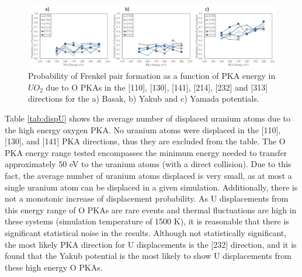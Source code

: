 \documentclass[8pt]{article}   	%
\begin{document}
\begin{figure}[h]
 \centering
 \includegraphics[width=1.0\textwidth]{FP_OE.png}
 \caption{Probability of Frenkel pair formation as a function of PKA energy in $UO_2$ due to O PKAs in the [110], [130], [141], [214], [232] and [313] directions for the a) Basak, b) Yakub and c) Yamada potentials.  }
 \label{fig:fpoe}
\end{figure}

Table \ref{tab:dispU} shows the average number of displaced uranium atoms due to the high energy oxygen PKA. No uranium atoms were displaced in the  [110], [130], and [141] PKA directions, thus they are excluded from the table. The O PKA energy range tested encompasses the minimum energy needed to transfer approximately 50 eV to the uranium atoms (with a direct collision). Due to this fact, the average number of uranium atoms displaced is very small, as at most a single uranium atom can be displaced in a given simulation. Additionally, there is not a monotonic increase of displacement probability. As U displacements from this energy range of O PKAs are rare events and thermal fluctuations are high in these systems (simulation temperature of 1500 K), it is reasonable that there is significant statistical noise in the results. Although not statistically significant, the most likely PKA direction for U displacements is the [232] direction, and it is found that the Yakub potential is the most likely to show U displacements from these high energy O PKAs.
\end{document}
